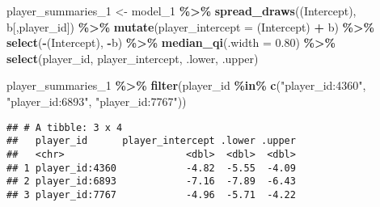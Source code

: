 \documentclass[
]{article}
\newenvironment{Shaded}{\begin{snugshade}}{\end{snugshade}}
\newcommand{\AttributeTok}[1]{\textcolor[rgb]{0.13,0.29,0.53}{#1}}
\newcommand{\FloatTok}[1]{\textcolor[rgb]{0.00,0.00,0.81}{#1}}
\newcommand{\FunctionTok}[1]{\textcolor[rgb]{0.13,0.29,0.53}{\textbf{#1}}}
\newcommand{\NormalTok}[1]{#1}
\newcommand{\OtherTok}[1]{\textcolor[rgb]{0.56,0.35,0.01}{#1}}
\newcommand{\SpecialCharTok}[1]{\textcolor[rgb]{0.81,0.36,0.00}{\textbf{#1}}}
\newcommand{\StringTok}[1]{\textcolor[rgb]{0.31,0.60,0.02}{#1}}
\begin{document}
\begin{Shaded}
\begin{Highlighting}[]
\NormalTok{player\_summaries\_1 }\OtherTok{\textless{}{-}}\NormalTok{ model\_1 }\SpecialCharTok{\%\textgreater{}\%}
  \FunctionTok{spread\_draws}\NormalTok{(}\StringTok{\textasciigrave{}}\AttributeTok{(Intercept)}\StringTok{\textasciigrave{}}\NormalTok{, b[,player\_id]) }\SpecialCharTok{\%\textgreater{}\%}
  \FunctionTok{mutate}\NormalTok{(}\AttributeTok{player\_intercept =} \StringTok{\textasciigrave{}}\AttributeTok{(Intercept)}\StringTok{\textasciigrave{}} \SpecialCharTok{+}\NormalTok{ b) }\SpecialCharTok{\%\textgreater{}\%}
  \FunctionTok{select}\NormalTok{(}\SpecialCharTok{{-}}\StringTok{\textasciigrave{}}\AttributeTok{(Intercept)}\StringTok{\textasciigrave{}}\NormalTok{, }\SpecialCharTok{{-}}\NormalTok{b) }\SpecialCharTok{\%\textgreater{}\%}
  \FunctionTok{median\_qi}\NormalTok{(}\AttributeTok{.width =} \FloatTok{0.80}\NormalTok{) }\SpecialCharTok{\%\textgreater{}\%}
  \FunctionTok{select}\NormalTok{(player\_id, player\_intercept, .lower, .upper)}

\NormalTok{player\_summaries\_1 }\SpecialCharTok{\%\textgreater{}\%}
  \FunctionTok{filter}\NormalTok{(player\_id }\SpecialCharTok{\%in\%} \FunctionTok{c}\NormalTok{(}\StringTok{"player\_id:4360"}\NormalTok{, }\StringTok{"player\_id:6893"}\NormalTok{, }\StringTok{"player\_id:7767"}\NormalTok{))}
\end{Highlighting}
\end{Shaded}

\begin{verbatim}
## # A tibble: 3 x 4
##   player_id      player_intercept .lower .upper
##   <chr>                     <dbl>  <dbl>  <dbl>
## 1 player_id:4360            -4.82  -5.55  -4.09
## 2 player_id:6893            -7.16  -7.89  -6.43
## 3 player_id:7767            -4.96  -5.71  -4.22
\end{verbatim}
\end{document}
